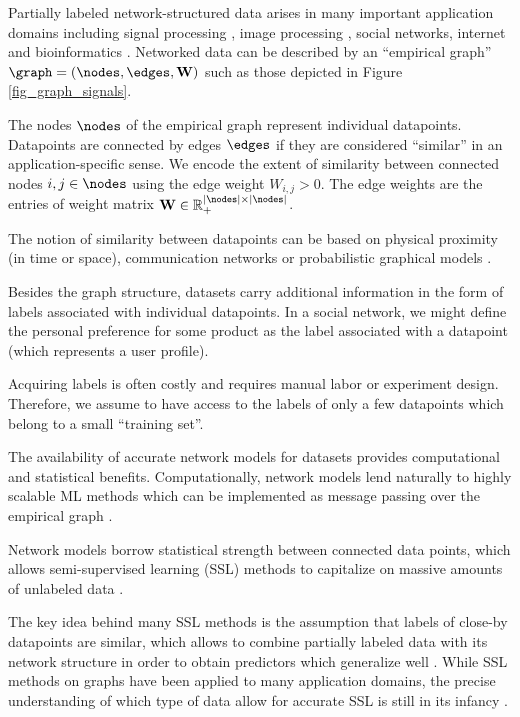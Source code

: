 \documentclass[12pt]{report}
\begin{document}
Partially labeled network-structured data arises in many important application 
domains including signal processing \cite{ChenVarma,Chen2015}, image 
processing \cite{LempKohli2009,ShiMalik2000}, social networks, internet and bioinformatics 
\cite{NewmannBook,SemiSupervisedBook,Fergus2009}. Networked data 
can be described by an ``empirical graph'' $\graph=(\nodes,\edges,\mathbf{W})$ 
such as those depicted in Figure \ref{fig_graph_signals}.   

The nodes $\nodes$ of the empirical graph represent individual datapoints. 
Datapoints are connected by edges $\edges$ if they are considered ``similar'' 
in an application-specific sense. We encode the extent of similarity between 
connected nodes $i,j \in \nodes$ using the edge weight $W_{i,j} > 0$. The 
edge weights are the entries of weight matrix $\mathbf{W} \in \mathbb{R}_{+}^{|\nodes| \times |\nodes|}$.  

The notion of similarity between datapoints can be based on physical 
proximity (in time or space), communication networks or probabilistic 
graphical models \cite{LauritzenGM,BishopBook,koller2009probabilistic}. 

Besides the graph structure, datasets carry additional information 
in the form of labels associated with individual datapoints. In a 
social network, we might define the personal preference for some 
product as the label associated with a datapoint (which represents 
a user profile). 

Acquiring labels is often costly and requires manual labor or 
experiment design. Therefore, we assume to have access to 
the labels of only a few datapoints which belong to a small ``training set''. 

The availability of accurate network models for datasets provides 
computational and statistical benefits. Computationally, network 
models lend naturally to highly scalable ML methods which 
can be implemented as message passing over the empirical graph \cite{DistrOptStatistLearningADMM}. 

Network models borrow statistical strength between connected data 
points, which allows semi-supervised learning (SSL) methods to 
capitalize on massive amounts of unlabeled data \cite{SemiSupervisedBook}. 

The key idea behind many SSL methods is the assumption that labels 
of close-by datapoints are similar, which allows to combine partially 
labeled data with its network structure in order to obtain predictors 
which generalize well \cite{SemiSupervisedBook,belkin2004regularization}. 
While SSL methods on graphs have been applied to many application 
domains, the precise understanding of which type of data allow for 
accurate SSL is still in its infancy \cite{ijcai2017-450,NSZ09,elalaoui16}. 
\end{document}
